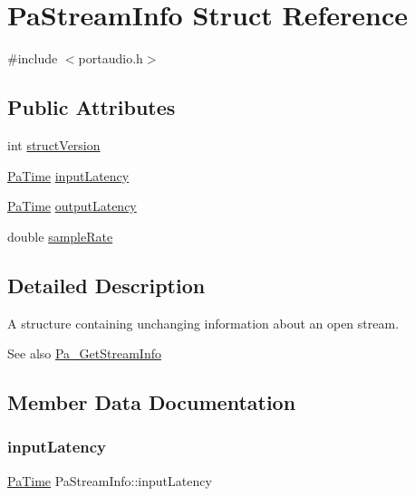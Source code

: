 \hypertarget{struct_pa_stream_info}{}\section{Pa\+Stream\+Info Struct Reference}
\label{struct_pa_stream_info}


{\ttfamily \#include $<$portaudio.\+h$>$}

\subsection*{Public Attributes}
\begin{DoxyCompactItemize}
\item 
int \hyperlink{struct_pa_stream_info_a5e053a3f0f6232a5d1ec0dee0f9a943b}{struct\+Version}
\item 
\hyperlink{portaudio_8h_af17a7e6d0471a23071acf8dbd7bbe4bd}{Pa\+Time} \hyperlink{struct_pa_stream_info_a1f5339e0fef75cea66d9153235698399}{input\+Latency}
\item 
\hyperlink{portaudio_8h_af17a7e6d0471a23071acf8dbd7bbe4bd}{Pa\+Time} \hyperlink{struct_pa_stream_info_a372a81f39d90a85ae62225e9f57a7840}{output\+Latency}
\item 
double \hyperlink{struct_pa_stream_info_a9200fdee790d9155bc35d03be51ee2dd}{sample\+Rate}
\end{DoxyCompactItemize}


\subsection{Detailed Description}
A structure containing unchanging information about an open stream. \begin{DoxySeeAlso}{See also}
\hyperlink{portaudio_8h_a3d9c4cbda4e9f381b76f287c3de8a758}{Pa\+\_\+\+Get\+Stream\+Info} 
\end{DoxySeeAlso}


\subsection{Member Data Documentation}
\mbox{\label{struct_pa_stream_info_a1f5339e0fef75cea66d9153235698399}} 
\subsubsection{\texorpdfstring{input\+Latency}{inputLatency}}
{\footnotesize\ttfamily \hyperlink{portaudio_8h_af17a7e6d0471a23071acf8dbd7bbe4bd}{Pa\+Time} Pa\+Stream\+Info\+::input\+Latency}

